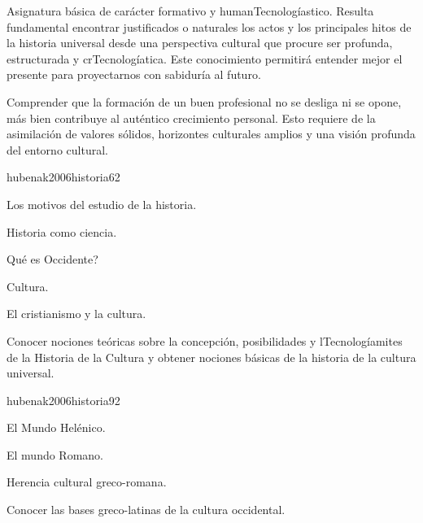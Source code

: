 \begin{syllabus}


\begin{justification}
Asignatura básica de carácter formativo y humanTecnologíastico. Resulta fundamental encontrar justificados o naturales los actos y los principales hitos de la historia universal desde una perspectiva cultural que procure ser profunda, estructurada y crTecnologíatica. Este conocimiento permitirá entender mejor el presente para proyectarnos con sabiduría al futuro.
\end{justification}

\begin{goals}
\item Comprender que la formación de un buen profesional no se desliga ni se opone, más bien contribuye al auténtico crecimiento personal. Esto requiere de la asimilación de valores sólidos, horizontes culturales amplios y una visión profunda del entorno cultural.
\end{goals}

\begin{outcomes}
\end{outcomes}

\begin{unit}{}{hubenak2006historia}{6}{2}
\begin{topics}
	\item Los motivos del estudio de la historia. 	
	\item Historia como ciencia. 	
	\item Qué es Occidente? 	
	\item Cultura. 	
	\item El cristianismo y la cultura. 
\end{topics}
\begin{unitgoals}
	\item Conocer nociones teóricas sobre la concepción, posibilidades y lTecnologíamites de la Historia de la Cultura y obtener nociones básicas de la historia de la cultura universal.
\end{unitgoals}
\end{unit}

\begin{unit}{}{hubenak2006historia}{9}{2}
\begin{topics}
	\item El Mundo Helénico. 	
	\item El mundo Romano. 	
	\item Herencia cultural greco-romana. 
\end{topics}
\begin{unitgoals}
	\item Conocer las bases greco-latinas de la cultura occidental.
\end{unitgoals}
\end{unit}


\end{syllabus}
